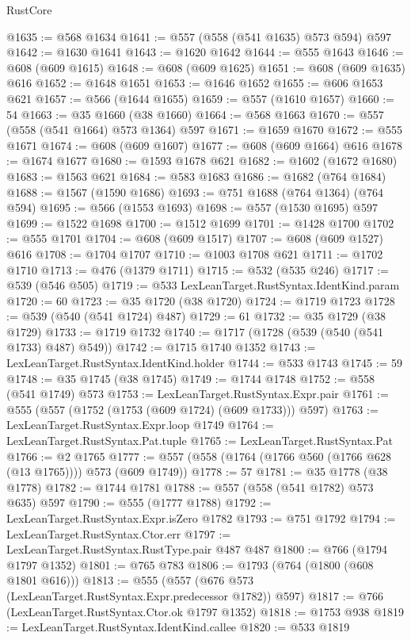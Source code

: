 \begin{lexlean}{RustCore}
\begin{coremodule}
@1635 := @568 @1634
@1641 := @557 (@558 (@541 @1635) @573 @594) @597
@1642 := @1630 @1641
@1643 := @1620 @1642
@1644 := @555 @1643
@1646 := @608 (@609 @1615)
@1648 := @608 (@609 @1625)
@1651 := @608 (@609 @1635) @616
@1652 := @1648 @1651
@1653 := @1646 @1652
@1655 := @606 @1653 @621
@1657 := @566 (@1644 @1655)
@1659 := @557 (@1610 @1657)
@1660 := 54
@1663 := @35 @1660 (@38 @1660)
@1664 := @568 @1663
@1670 := @557 (@558 (@541 @1664) @573 @1364) @597
@1671 := @1659 @1670
@1672 := @555 @1671
@1674 := @608 (@609 @1607)
@1677 := @608 (@609 @1664) @616
@1678 := @1674 @1677
@1680 := @1593 @1678 @621
@1682 := @1602 (@1672 @1680)
@1683 := @1563 @621
@1684 := @583 @1683
@1686 := @1682 (@764 @1684)
@1688 := @1567 (@1590 @1686)
@1693 := @751 @1688 (@764 @1364) (@764 @594)
@1695 := @566 (@1553 @1693)
@1698 := @557 (@1530 @1695) @597
@1699 := @1522 @1698
@1700 := @1512 @1699
@1701 := @1428 @1700
@1702 := @555 @1701
@1704 := @608 (@609 @1517)
@1707 := @608 (@609 @1527) @616
@1708 := @1704 @1707
@1710 := @1003 @1708 @621
@1711 := @1702 @1710
@1713 := @476 (@1379 @1711)
@1715 := @532 (@535 @246)
@1717 := @539 (@546 @505)
@1719 := @533 LexLeanTarget.RustSyntax.IdentKind.param
@1720 := 60
@1723 := @35 @1720 (@38 @1720)
@1724 := @1719 @1723
@1728 := @539 (@540 (@541 @1724) @487)
@1729 := 61
@1732 := @35 @1729 (@38 @1729)
@1733 := @1719 @1732
@1740 := @1717 (@1728 (@539 (@540 (@541 @1733) @487) @549))
@1742 := @1715 @1740 @1352
@1743 := LexLeanTarget.RustSyntax.IdentKind.holder
@1744 := @533 @1743
@1745 := 59
@1748 := @35 @1745 (@38 @1745)
@1749 := @1744 @1748
@1752 := @558 (@541 @1749) @573
@1753 := LexLeanTarget.RustSyntax.Expr.pair
@1761 := @555 (@557 (@1752 (@1753 (@609 @1724) (@609 @1733))) @597)
@1763 := LexLeanTarget.RustSyntax.Expr.loop @1749
@1764 := LexLeanTarget.RustSyntax.Pat.tuple
@1765 := LexLeanTarget.RustSyntax.Pat
@1766 := @2 @1765
@1777 := @557 (@558 (@1764 (@1766 @560 (@1766 @628 (@13 @1765)))) @573 (@609 @1749))
@1778 := 57
@1781 := @35 @1778 (@38 @1778)
@1782 := @1744 @1781
@1788 := @557 (@558 (@541 @1782) @573 @635) @597
@1790 := @555 (@1777 @1788)
@1792 := LexLeanTarget.RustSyntax.Expr.isZero @1782
@1793 := @751 @1792
@1794 := LexLeanTarget.RustSyntax.Ctor.err
@1797 := LexLeanTarget.RustSyntax.RustType.pair @487 @487
@1800 := @766 (@1794 @1797 @1352)
@1801 := @765 @783
@1806 := @1793 (@764 (@1800 (@608 @1801 @616)))
@1813 := @555 (@557 (@676 @573 (LexLeanTarget.RustSyntax.Expr.predecessor @1782)) @597)
@1817 := @766 (LexLeanTarget.RustSyntax.Ctor.ok @1797 @1352)
@1818 := @1753 @938
@1819 := LexLeanTarget.RustSyntax.IdentKind.callee
@1820 := @533 @1819

\end{coremodule}
\end{lexlean}
